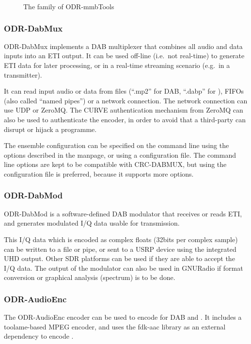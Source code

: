 \begin{figure}[h]
    \centering
    \caption{The family of ODR-mmbTools}
    \label{fig:family_mmbTools}
\end{figure}

\subsubsection{ODR-DabMux}
ODR-DabMux implements a DAB multiplexer that combines all audio and data inputs
into an ETI output. It can be used off-line (i.e.~not real-time) to generate ETI
data for later processing, or in a real-time streaming scenario (e.g.~in a
transmitter).

It can read input audio or data from files (``.mp2'' for DAB, ``.dabp'' for
\dabplus), FIFOs (also called ``named pipes'') or a network connection. The
network connection can use UDP or ZeroMQ. The CURVE authentication mechanism
from ZeroMQ can also be used to authenticate the encoder, in order to avoid that
a third-party can disrupt or hijack a programme.

The ensemble configuration can be specified on the command line using the
options described in the manpage, or using a configuration file. The command
line options are kept to be compatible with CRC-DABMUX, but using the
configuration file is preferred, because it supports more options.


\subsubsection{ODR-DabMod}
ODR-DabMod is a software-defined DAB modulator that receives or reads ETI, and
generates modulated I/Q data usable for transmission.

This I/Q data which is encoded as complex floats (32bits per complex sample) can
be written to a file or pipe, or sent to a USRP device using the integrated UHD
output. Other SDR platforms can be used if they are able to accept the I/Q data.
The output of the modulator can also be used in GNURadio if format conversion or
graphical analysis (spectrum) is to be done.

\subsubsection{ODR-AudioEnc}
The ODR-AudioEnc encoder can be used to encode for DAB and \dabplus. It includes
a toolame-based MPEG encoder, and uses the \mbox{fdk-aac} library as an external
dependency to encode \dabplus{}.

